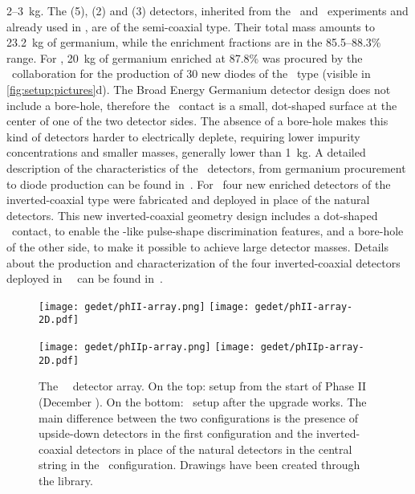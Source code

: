 2--3~kg. The \ANG{} (5), \RG{} (2) and \GTF{} (3) detectors, inherited from the \hdm\ and
\igex\ experiments and already used in \phaseone, are of the semi-coaxial type. Their
total mass amounts to 23.2~kg of germanium, while the enrichment fractions are in the
85.5--88.3\% range. For \phasetwo, 20~kg of germanium enriched at 87.8\% was procured by
the \gerda\ collaboration for the production of 30 new diodes of the \bege\ type (visible
in \cref{fig:setup:pictures}d). The Broad Energy Germanium detector design does not
include a bore-hole, therefore the \pplus\ contact is a small, dot-shaped surface at the
center of one of the two detector sides. The absence of a bore-hole makes this kind of
detectors harder to electrically deplete, requiring lower impurity concentrations and
smaller masses, generally lower than 1~kg. A detailed description of the characteristics
of the \bege\ detectors, from germanium procurement to diode production can be found
in~\cite{Agostini2015e, Agostini2018a, Agostini2019}. For \phasetwop\ four new enriched
\IC{} detectors of the inverted-coaxial type were fabricated and deployed in place of the
natural \GTF{} detectors. This new inverted-coaxial geometry design includes a dot-shaped
\pplus\ contact, to enable the \bege-like pulse-shape discrimination features, and a
bore-hole of the other side, to make it possible to achieve large detector masses. Details
about the production and characterization of the  four inverted-coaxial detectors deployed
in \gerda\ \phasetwop\ can be found in~\cite{Miloradovic2020, Agostini2021b}.

\begin{figure}
  \centering
  \texttt{[image: gedet/phII-array.png]}%
  \hspace{0.5cm}%
  \texttt{[image: gedet/phII-array-2D.pdf]}
  \vspace{0.5cm}

  \texttt{[image: gedet/phIIp-array.png]}%
  \hspace{0.5cm}%
  \texttt{[image: gedet/phIIp-array-2D.pdf]}
  \caption[placeholder]{%
    The \gerda\ \phasetwo\ detector array. On the top: setup from the start of Phase II
    (December ). On the bottom: \phasetwop\ setup after the  upgrade works. The
    main difference between the two configurations is the presence of upside-down detectors
    in the first configuration and the inverted-coaxial detectors in place of the natural
    detectors in the central string in the \phasetwop\ configuration. Drawings have been
    created through the  library\footnotemark{}. 
  }\label{fig:setup:array}
\end{figure}

